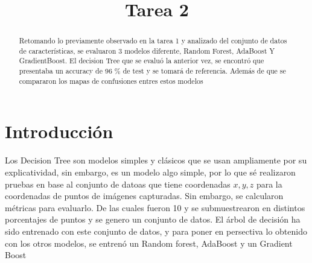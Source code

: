 \documentclass[conference]{IEEEtran}
\begin{document}
\title{Tarea 2}

\author{
}

\maketitle

\begin{abstract}
Retomando lo previamente observado en la tarea 1 y analizado del conjunto de datos de características, se evaluaron 3 modelos diferente, Random Forest, AdaBoost Y GradientBoost. El decision Tree que se evaluó la anterior vez, se encontró que presentaba un accuracy de 96 \% de test y se tomará de referencia. Además de que se compararon los mapas de confusiones entres estos modelos
\end{abstract}

\section{Introducción}
Los Decision Tree son modelos simples y clásicos que se usan ampliamente por su explicatividad, sin embargo, es un modelo algo simple, por lo que sé realizaron pruebas en base al conjunto de datoas que tiene coordenadas $x,y,z$ para la coordenadas de puntos de imágenes capturadas. Sin embargo, se calcularon métricas para evaluarlo. De las cuales fueron 10 y se submuestrearon en distintos porcentajes de puntos y se genero un conjunto de datos. El árbol de decisión ha sido entrenado con este conjunto de datos, y para poner en persectiva lo obtenido con los otros modelos, se entrenó un Random forest, AdaBoost y un Gradient Boost
\end{document}
